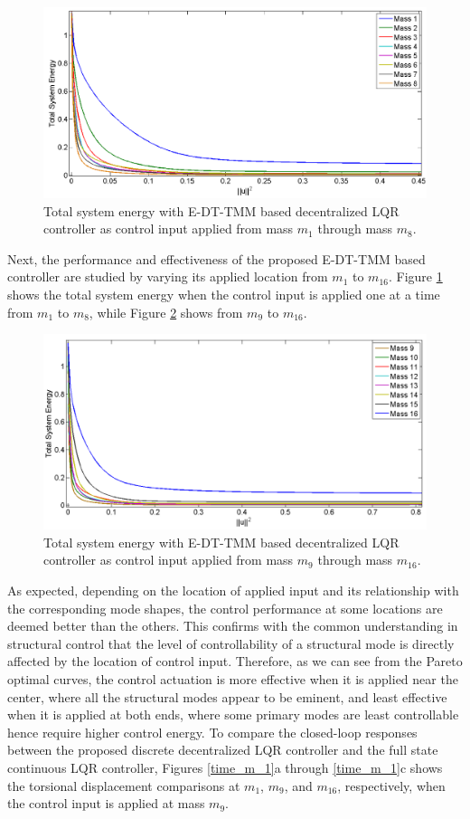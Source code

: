 \documentclass[11pt]{ucthesis}
\begin{document}
\begin{figure}[thpb]
\centering
\includegraphics[width=0.8\linewidth]{Figures/FirstHalfPareto.png}
\caption{Total system energy with E-DT-TMM based decentralized LQR controller as control input applied from mass $m_1$ through mass $m_8$.}
\label{fig:FirstHalfDPareto}
\end{figure}

Next, the performance and effectiveness of the proposed E-DT-TMM based controller are studied by varying its applied location from $m_1$ to $m_{16}$. Figure \ref{fig:FirstHalfDPareto} shows the total system energy when the control input is applied one at a time from $m_1$ to $m_8$, while Figure \ref{fig:SecHalfDPareto} shows from $m_9$ to $m_{16}$. 
\begin{figure}[thpb]
\centering
\includegraphics[width=0.8\linewidth]{Figures/SecondHalfPareto.png}
\caption{Total system energy with E-DT-TMM based decentralized LQR controller as control input applied from mass $m_9$ through mass $m_{16}$. }
\label{fig:SecHalfDPareto}
\end{figure}
As expected, depending on the location of applied input and its relationship with the corresponding mode shapes, the control performance at some locations are deemed better than the others. This confirms with the common understanding in structural control that the level of controllability of a structural mode is directly affected by the location of control input. Therefore, as we can see from the Pareto optimal curves, the control actuation is more effective when it is applied near the center, where all the structural modes appear to be eminent, and least effective when it is applied at both ends, where some primary modes are least controllable hence require higher control energy. To compare the closed-loop responses between the proposed discrete decentralized LQR controller and the full state continuous LQR controller, Figures \ref{time_m_1}a through \ref{time_m_1}c shows the torsional displacement comparisons at $m_1$, $m_9$, and $m_{16}$, respectively, when the control input is applied at mass $m_9$.
\end{document}
